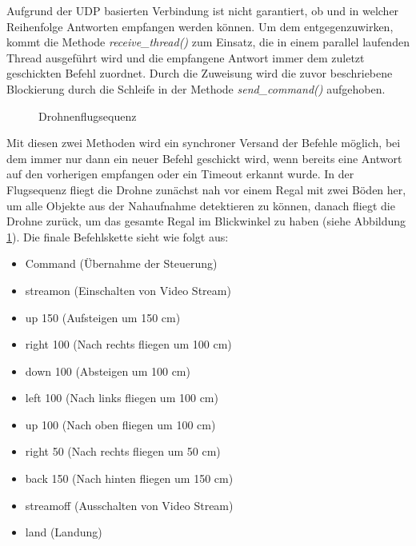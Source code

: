 Aufgrund der UDP basierten Verbindung ist nicht garantiert, ob und in welcher Reihenfolge Antworten empfangen werden können. Um dem entgegenzuwirken, kommt die Methode \textit{receive\_thread()} zum Einsatz, die in einem parallel laufenden Thread ausgeführt wird und die empfangene Antwort immer dem zuletzt geschickten Befehl zuordnet. Durch die Zuweisung wird die zuvor beschriebene Blockierung durch die Schleife in der Methode \textit{send\_command()} aufgehoben. 

\begin{figure}[ht]
	\caption[Drohnenflugsequenz]{Drohnenflugsequenz} 
	\label{sequenz}
\end{figure} 

Mit diesen zwei Methoden wird ein synchroner Versand der Befehle möglich, bei dem immer nur dann ein neuer Befehl geschickt wird, wenn bereits eine Antwort auf den vorherigen empfangen oder ein Timeout erkannt wurde. In der Flugsequenz fliegt die Drohne zunächst nah vor einem Regal mit zwei Böden her, um alle Objekte aus der Nahaufnahme detektieren zu können, danach fliegt die Drohne zurück, um das gesamte Regal im Blickwinkel zu haben (siehe Abbildung \ref{sequenz}). Die finale Befehlskette sieht wie folgt aus:

\begin{itemize}
	\item Command (Übernahme der Steuerung)
	\item streamon (Einschalten von Video Stream)
	\item up 150 (Aufsteigen um 150 cm)
	\item right 100 (Nach rechts fliegen um 100 cm)
	\item down 100 (Absteigen um 100 cm)
	\item left 100 (Nach links fliegen um 100 cm)
	\item up 100 (Nach oben fliegen um 100 cm)
	\item right 50 (Nach rechts fliegen um 50 cm)
	\item back 150 (Nach hinten fliegen um 150 cm)
	\item streamoff (Ausschalten von Video Stream)
	\item land (Landung)
\end{itemize}

